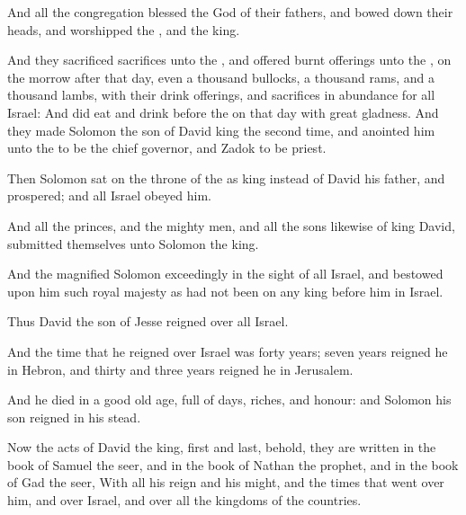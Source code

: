 And all the congregation blessed the \LORD God of their fathers, and bowed down their heads, and worshipped the \LORD, and the king.

\Verse And they sacrificed sacrifices unto the \LORD, and offered burnt offerings unto the \LORD, on the morrow after that day, even a thousand bullocks, a thousand rams, and a thousand lambs, with their drink offerings, and sacrifices in abundance for all Israel: \Verse And did eat and drink before the \LORD on that day with great gladness. And they made Solomon the son of David king the second time, and anointed him unto the \LORD to be the chief governor, and Zadok to be priest.

\Verse Then Solomon sat on the throne of the \LORD as king instead of David his father, and prospered; and all Israel obeyed him.

\Verse And all the princes, and the mighty men, and all the sons likewise of king David, submitted themselves unto Solomon the king.

\Verse And the \LORD magnified Solomon exceedingly in the sight of all Israel, and bestowed upon him such royal majesty as had not been on any king before him in Israel.

\Verse Thus David the son of Jesse reigned over all Israel.

\Verse And the time that he reigned over Israel was forty years; seven years reigned he in Hebron, and thirty and three years reigned he in Jerusalem.

\Verse And he died in a good old age, full of days, riches, and honour: and Solomon his son reigned in his stead.

\Verse Now the acts of David the king, first and last, behold, they are written in the book of Samuel the seer, and in the book of Nathan the prophet, and in the book of Gad the seer, \Verse With all his reign and his might, and the times that went over him, and over Israel, and over all the kingdoms of the countries.


